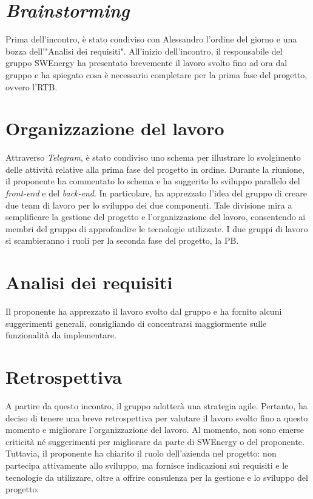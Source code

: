 \section{\textit{Brainstorming}}

Prima dell'incontro, è stato condiviso con Alessandro l'ordine del giorno e 
una bozza dell'"Analisi dei requisiti". All'inizio dell'incontro, il 
responsabile del gruppo SWEnergy ha presentato brevemente il lavoro svolto 
fino ad ora dal gruppo e ha spiegato cosa è necessario completare per la prima 
fase del progetto, ovvero l'RTB.

\section{Organizzazione del lavoro}

Attraverso \textit{Telegram}, è stato condiviso uno schema per illustrare lo 
svolgimento delle attività relative alla prima fase del progetto in ordine. 
Durante la riunione, il proponente ha commentato lo schema e ha suggerito lo 
sviluppo parallelo del \textit{front-end} e del \textit{back-end}. In 
particolare, ha apprezzato l'idea del gruppo di creare due team di lavoro per lo 
sviluppo dei due componenti. Tale divisione mira a semplificare la gestione del 
progetto e l'organizzazione del lavoro, consentendo ai membri del gruppo di 
approfondire le tecnologie utilizzate. I due gruppi di lavoro si scambieranno 
i ruoli per la seconda fase del progetto, la PB.

\section{Analisi dei requisiti}

Il proponente ha apprezzato il lavoro svolto dal gruppo e ha fornito alcuni 
suggerimenti generali, consigliando di concentrarsi maggiormente sulle 
funzionalità da implementare.

\section{Retrospettiva}

A partire da questo incontro, il gruppo adotterà una strategia agile. Pertanto, 
ha deciso di tenere una breve retrospettiva per valutare il lavoro svolto fino a 
questo momento e migliorare l'organizzazione del lavoro. Al momento, non sono 
emerse criticità né suggerimenti per migliorare da parte di SWEnergy o del 
proponente. Tuttavia, il proponente ha chiarito il ruolo dell'azienda nel 
progetto: non partecipa attivamente allo sviluppo, ma fornisce indicazioni sui 
requisiti e le tecnologie da utilizzare, oltre a offrire consulenza per la 
gestione e lo sviluppo del progetto.

